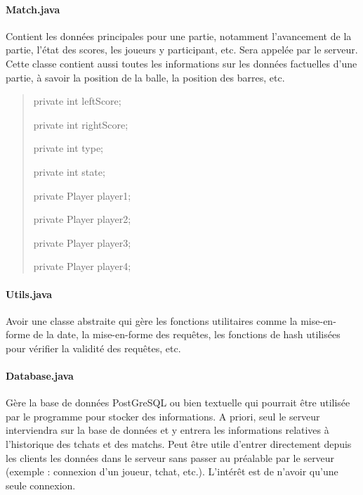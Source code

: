 \documentclass[a4paper,12pt]{report}
\begin{document}
\paragraph{Match.java}
Contient les données principales pour une partie, notamment l'avancement de la partie, l'état des scores, les joueurs y participant, etc. Sera appelée par le serveur. Cette classe contient aussi toutes les informations sur les données factuelles d'une partie, à savoir la position de la balle, la position des barres, etc.
\begin{quote}
    private int leftScore;
    
	private int rightScore;
	
	private int type;
	
	private int state;
	
	private Player player1;
    
	private Player player2;
    
	private Player player3;
    
	private Player player4;
\end{quote}
\paragraph{Utils.java}
Avoir une classe abstraite qui gère les fonctions utilitaires comme la mise-en-forme de la date, la mise-en-forme des requêtes, les fonctions de hash utilisées pour vérifier la validité des requêtes, etc.
\paragraph{Database.java}
Gère la base de données PostGreSQL ou bien textuelle qui pourrait être utilisée par le programme pour stocker des informations. A priori, seul le serveur interviendra sur la base de données et y entrera les informations relatives à l'historique des tchats et des matchs. Peut être utile d'entrer directement depuis les clients les données dans le serveur sans passer au préalable par le serveur (exemple : connexion d'un joueur, tchat, etc.). L'intérêt est de n'avoir qu'une seule connexion.

\end{document}
